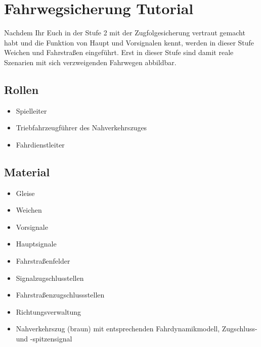 

\section{Fahrwegsicherung Tutorial}

Nachdem Ihr Euch in der Stufe 2 mit der Zugfolgesicherung vertraut gemacht habt und die Funktion von Haupt und Vorsignalen kennt, werden in dieser Stufe Weichen und Fahrstraßen eingeführt. Erst in dieser Stufe sind damit reale Szenarien mit sich verzweigenden Fahrwegen abbildbar.

\subsection*{Rollen}

  \begin{itemize}
    \item Spielleiter
    \item Triebfahrzeugführer des Nahverkehrszuges
    \item Fahrdienstleiter
  \end{itemize}

\subsection*{Material}

  \begin{itemize}
    \item Gleise
    \item Weichen
    \item Vorsignale
    \item Hauptsignale
    \item Fahrstraßenfelder
    \item Signalzugschlusstellen
    \item Fahrstraßenzugschlussstellen
    \item Richtungsverwaltung
    \item Nahverkehrszug (braun) mit entsprechenden Fahrdynamikmodell, Zugschluss- und -spitzensignal
  \end{itemize}


